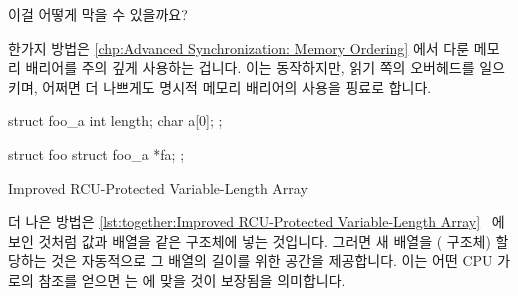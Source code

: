 이걸 어떻게 막을 수 있을까요?

한가지 방법은
\cref{chp:Advanced Synchronization: Memory Ordering} 에서 다룬 메모리 배리어를
주의 깊게 사용하는 겁니다.
이는 동작하지만, 읽기 쪽의 오버헤드를 일으키며, 어쩌면 더 나쁘게도 명시적
메모리 배리어의 사용을 핑료로 합니다.

\iffalse

How can we prevent this?

One approach is to make careful use of memory barriers, which are
covered in \cref{chp:Advanced Synchronization: Memory Ordering}.
This works, but incurs read-side overhead and, perhaps worse, requires
use of explicit memory barriers.

\fi

\begin{listing}[tbp]
\begin{VerbatimL}[tabsize=8]
struct foo_a {
	int length;
	char a[0];
};

struct foo {
	struct foo_a *fa;
};
\end{VerbatimL}
\caption{Improved RCU-Protected Variable-Length Array}
\label{lst:together:Improved RCU-Protected Variable-Length Array}
\end{listing}

더 나은 방법은
\cref{lst:together:Improved RCU-Protected Variable-Length Array}~\cite{Arcangeli03}
에 보인 것처럼 값과 배열을 같은 구조체에 넣는 것입니다.
그러면 새 배열을 ( 구조체) 할당하는 것은 자동적으로 그 배열의 길이를
위한 공간을 제공합니다.
이는 어떤 CPU 가  로의 참조를 얻으면  는  에
맞을 것이 보장됨을 의미합니다.

\iffalse

A better approach is to put the value and the array into the same structure,
as shown in
\cref{lst:together:Improved RCU-Protected Variable-Length Array}~\cite{Arcangeli03}.
Allocating a new array (\co{foo_a} structure) then automatically provides
a new place for the array length.
This means that if any CPU picks up a reference to \co{->fa}, it is
guaranteed that the \co{->length} will match the \co{->a[]}.

\fi

